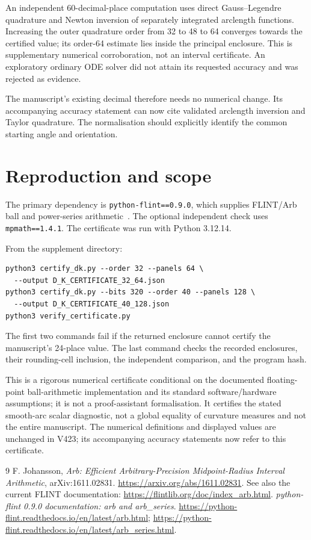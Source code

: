\documentclass[10pt,a4paper]{article}
\begin{document}
An independent 60-decimal-place computation uses direct Gauss--Legendre
quadrature and Newton inversion of separately integrated arclength functions.
Increasing the outer quadrature order from 32 to 48 to 64 converges towards the
certified value; its order-64 estimate lies inside the principal enclosure.
This is supplementary numerical corroboration, not an interval certificate.
An exploratory ordinary ODE solver did not attain its requested accuracy and was
rejected as evidence.

The manuscript's existing decimal therefore needs no numerical change.
Its accompanying accuracy statement can now cite validated arclength inversion
and Taylor quadrature. The normalisation should explicitly identify the common
starting angle and orientation.

\section{Reproduction and scope}
The primary dependency is \texttt{python-flint==0.9.0}, which supplies FLINT/Arb
ball and power-series arithmetic~\cite{arb,series}.
The optional independent check uses \texttt{mpmath==1.4.1}.
The certificate was run with Python 3.12.14.

From the supplement directory:
\begin{verbatim}
python3 certify_dk.py --order 32 --panels 64 \
  --output D_K_CERTIFICATE_32_64.json
python3 certify_dk.py --bits 320 --order 40 --panels 128 \
  --output D_K_CERTIFICATE_40_128.json
python3 verify_certificate.py
\end{verbatim}
The first two commands fail if the returned enclosure cannot certify the
manuscript's 24-place value. The last command checks the recorded enclosures,
their rounding-cell inclusion, the independent comparison, and the program hash.

This is a rigorous numerical certificate conditional on the documented
floating-point ball-arithmetic implementation and its standard software/hardware
assumptions; it is not a proof-assistant formalisation.
It certifies the stated smooth-arc scalar diagnostic, not a global equality of
curvature measures and not the entire manuscript.
The numerical definitions and displayed values are unchanged in V423;
its accompanying accuracy statements now refer to this certificate.

\begin{thebibliography}{9}
F. Johansson, \emph{Arb: Efficient Arbitrary-Precision Midpoint-Radius Interval
Arithmetic}, arXiv:1611.02831.
\url{https://arxiv.org/abs/1611.02831}.
See also the current FLINT documentation:
\url{https://flintlib.org/doc/index_arb.html}.
\bibitem{series}
\emph{python-flint 0.9.0 documentation: arb and arb\_series}.
\url{https://python-flint.readthedocs.io/en/latest/arb.html};
\url{https://python-flint.readthedocs.io/en/latest/arb_series.html}.
\end{thebibliography}
\end{document}
